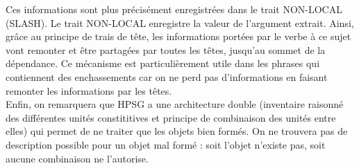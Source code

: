 Ces informations sont plus précisément enregistrées dans le trait NON-LOCAL (SLASH).
Le trait NON-LOCAL enregistre la valeur de l'argument extrait.
Ainsi, grâce au principe de trais de tête, les informations portées par le verbe à ce sujet vont remonter et être partagées par toutes les têtes, jusqu'au sommet de la dépendance.
Ce mécanisme est particulièrement utile dans les phrases qui contiennent des enchassements car on ne perd pas d'informations en faisant remonter les informations par les têtes.\\

Enfin, on remarquera que HPSG a une architecture double (inventaire raisonné des différentes unités constititives et principe de combinaison des unités entre elles) qui permet de ne traiter que les objets bien formés.
On ne trouvera pas de description possible pour un objet mal formé : soit l'objet n'existe pas, soit aucune combinaison ne l'autorise.
